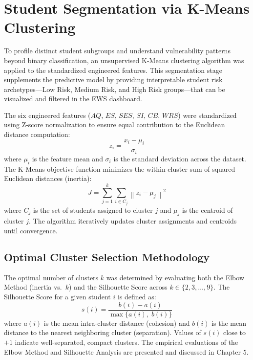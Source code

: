 \section{Student Segmentation via K-Means Clustering}
\label{sec:student_segmentation}

To profile distinct student subgroups and understand vulnerability patterns beyond binary classification, an unsupervised K-Means clustering algorithm was applied to the standardized engineered features. This segmentation stage supplements the predictive model by providing interpretable student risk archetypes---Low Risk, Medium Risk, and High Risk groups---that can be visualized and filtered in the EWS dashboard.

The six engineered features ($AQ$, $ES$, $SES$, $SI$, $CB$, $WRS$) were standardized using Z-score normalization to ensure equal contribution to the Euclidean distance computation:
\begin{equation}
    z_i = \frac{x_i - \mu_i}{\sigma_i}
    \label{eq:zscore}
\end{equation}
where $\mu_i$ is the feature mean and $\sigma_i$ is the standard deviation across the dataset. The K-Means objective function minimizes the within-cluster sum of squared Euclidean distances (inertia):
\begin{equation}
    J = \sum_{j=1}^{k} \sum_{i \in C_j} \left\| z_i - \mu_j \right\|^2
    \label{eq:kmeans_inertia}
\end{equation}
where $C_j$ is the set of students assigned to cluster $j$ and $\mu_j$ is the centroid of cluster $j$. The algorithm iteratively updates cluster assignments and centroids until convergence.

\subsection{Optimal Cluster Selection Methodology}
\label{subsec:optimal_k_method}

The optimal number of clusters $k$ was determined by evaluating both the Elbow Method (inertia vs.\ $k$) and the Silhouette Score across $k \in \{2, 3, \ldots, 9\}$. The Silhouette Score for a given student $i$ is defined as:
\begin{equation}
    s(i) = \frac{b(i) - a(i)}{\max\{a(i),\; b(i)\}}
    \label{eq:silhouette}
\end{equation}
where $a(i)$ is the mean intra-cluster distance (cohesion) and $b(i)$ is the mean distance to the nearest neighboring cluster (separation). Values of $s(i)$ close to $+1$ indicate well-separated, compact clusters. The empirical evaluations of the Elbow Method and Silhouette Analysis are presented and discussed in Chapter 5.

